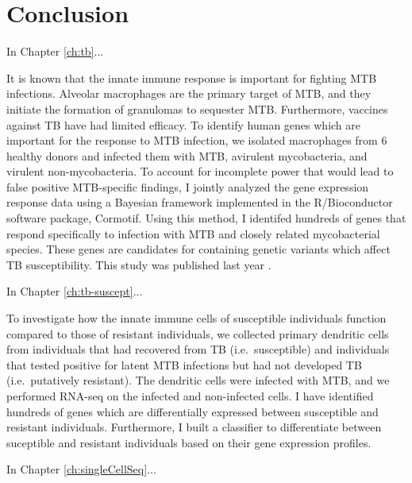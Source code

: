 \chapter{Conclusion}\label{conclusion}

In Chapter \ref{ch:tb}...

It is known that the innate immune response is important for fighting
MTB infections. Alveolar macrophages are the primary target of MTB,
and they initiate the formation of granulomas to sequester
MTB. Furthermore, vaccines against TB have had limited efficacy. To
identify human genes which are important for the response to MTB
infection, we isolated macrophages from 6 healthy donors and infected
them with MTB, avirulent mycobacteria, and virulent
non-mycobacteria. To account for incomplete power that would lead to
false positive MTB-specific findings, I jointly analyzed the gene
expression response data using a Bayesian framework implemented in the
R/Bioconductor software package, Cormotif. Using this method, I
identifed hundreds of genes that respond specifically to infection
with MTB and closely related mycobacterial species. These genes are
candidates for containing genetic variants which affect TB
susceptibility. This study was published last year
\citep{Blischak2015}.

In Chapter \ref{ch:tb-suscept}...

To investigate how the innate immune cells of susceptible individuals
function compared to those of resistant individuals, we collected
primary dendritic cells from individuals that had recovered from TB
(i.e.~susceptible) and individuals that tested positive for latent MTB
infections but had not developed TB (i.e.~putatively resistant). The
dendritic cells were infected with MTB, and we performed RNA-seq on
the infected and non-infected cells. I have identified hundreds of
genes which are differentially expressed between susceptible and
resistant individuals. Furthermore, I built a classifier to
differentiate between suceptible and resistant individuals based on
their gene expression profiles.

In Chapter \ref{ch:singleCellSeq}...

